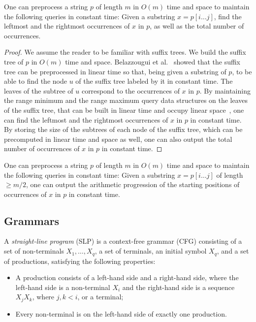 \begin{proposition}
\label{prop:suffix_tree}
One can preprocess a string $p$ of length $m$ in $O(m)$ time and space to maintain the following queries in constant time: Given a substring $x = p[i \dots j]$, find the leftmost and the rightmost occurrences of $x$ in $p$, as well as the total number of occurrences.  
\end{proposition}
\begin{proof}
We assume the reader to be familiar with suffix trees. We build the suffix tree of $p$ in $O(m)$ time and space. Belazzougui et al.~\cite{belazzougui_et_al:LIPIcs.CPM.2021.8} showed that the suffix tree can be preprocessed in linear time so that, being given a substring of $p$, to be able to find the node $u$ of the suffix tree labeled by it in constant time. The leaves of the subtree of $u$ correspond to the occurrences of $x$ in $p$. By maintaining the range minimum and the range maximum query data structures on the leaves of the suffix tree, that can be built in linear time and occupy linear space~\cite{10.1007/11780441_5}, one can find the leftmost and the rightmost occurrences of $x$ in $p$ in constant time. By storing the size of the subtrees of each node of the suffix tree, which can be precomputed in linear time and space as well, one can also output the total number of occurrences of $x$ in $p$ in constant time.
\end{proof}

\begin{corollary}
\label{cor:imp}
One can preprocess a string $p$ of length $m$ in $O(m)$ time and space to maintain the following queries in constant time: Given a substring $x = p[i \dots j]$ of length $\ge m/2$, one can output the arithmetic progression of the starting positions of occurrences of $x$ in $p$ in constant time.
\end{corollary}



\subsection{Grammars}
\begin{definition}
A \emph{straight-line program} (SLP)  is a context-free grammar (CFG) consisting of a set of non-terminals $X_1, \ldots, X_q$, a set of terminals, an initial symbol $X_q$, and a set of productions, satisfying the following properties:
\begin{itemize}
\item A production consists of a left-hand side and a right-hand side, where the left-hand side is a non-terminal $X_i$ and the right-hand side is a sequence $X_jX_k$, where $j,k < i$, or a terminal;
\item Every non-terminal is on the left-hand side of exactly one production.
\end{itemize}
\end{definition}


